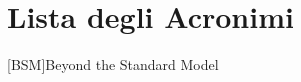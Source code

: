 \newpage
\section*{Lista degli Acronimi}
\begin{acronym}[LISTA]
[BSM]{Beyond the Standard Model}
\end{acronym}


